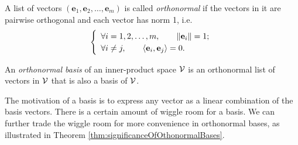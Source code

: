 


\begin{defn}
  \label{def:orthonormalList}
  A list of vectors
  $(\mathbf{e}_1, \mathbf{e}_2, \ldots, \mathbf{e}_m)$
  is called \emph{orthonormal}
  if the vectors in it are pairwise orthogonal
  and each vector has norm 1, i.e.
  \begin{equation}
    \label{eq:orthonormalList}
    \renewcommand{\arraystretch}{1.2}
    \left\{
      \begin{array}{l}
        \forall i=1,2,\ldots,m, \qquad
        \|\mathbf{e}_i\| = 1;
        \\
        \forall i\ne j, \qquad \innerProd{\mathbf{e}_i, \mathbf{e}_j}=0.
      \end{array}
    \right.
  \end{equation}
\end{defn}

\begin{defn}
  \label{def:orthonormalBasis}
  An \emph{orthonormal basis}
  of an inner-product space ${\cal V}$
  is an orthonormal list of vectors in ${\cal V}$
  that is also a basis of ${\cal V}$.
\end{defn}

\begin{rem}
  The motivation of a basis
  is to express any vector as a linear combination
  of the basis vectors.
  There is a certain amount of wiggle room
  for a basis.
  We can further trade the wiggle room
  for more convenience
  in orthonormal bases,
  as illustrated in Theorem \ref{thm:significanceOfOthonormalBases}.
\end{rem}

